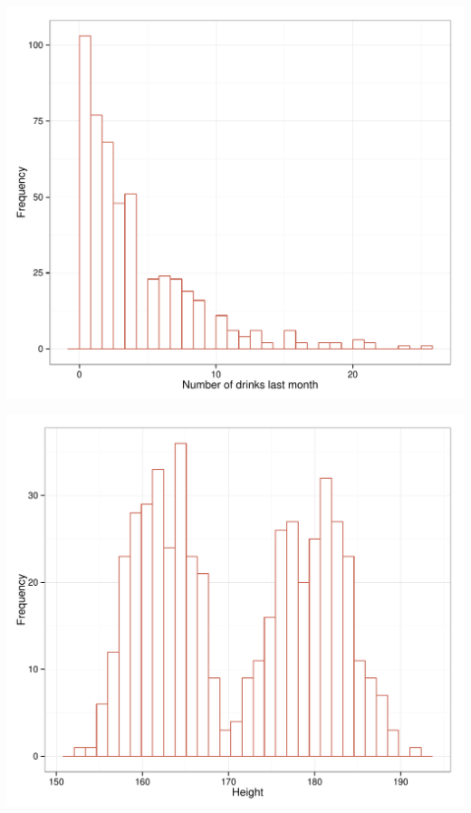 \documentclass[dvipsnames]{beamer}\usepackage[]{graphicx}\usepackage[]{color}
\makeatletter
\def\maxwidth{ %
  \ifdim\Gin@nat@width>\linewidth
    \linewidth
  \else
    \Gin@nat@width
  \fi
}
\newenvironment{knitrout}{}{} %
\makeatother
\begin{document}
\begin{frame}
\begin{knitrout}
\color{fgcolor}

{\centering \includegraphics[width=\maxwidth]{figure/unnamed-chunk-4-1} 

}



\end{knitrout}
\end{frame}

\begin{frame}
\begin{knitrout}
\color{fgcolor}

{\centering \includegraphics[width=\maxwidth]{figure/unnamed-chunk-5-1} 

}



\end{knitrout}
\end{frame}
\end{document}
